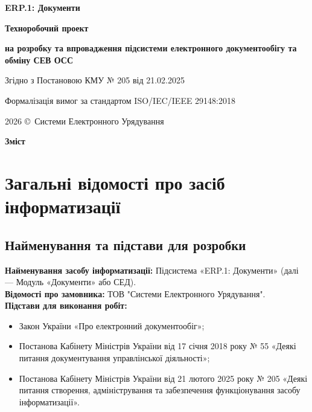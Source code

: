 \documentclass{article}
\newcommand\HUGE[1]{\fontsize{40}{40}\selectfont #1}
\begin{document}
\pagestyle{fancy}

\begin{titlepage}
  \AddToShipoutPictureBG*{\AtPageLowerLeft{\color{nato}\rule{\paperwidth}{\paperheight}}}
  \color{white}\thispagestyle{empty}\vspace*{3cm}\centering
  {\Huge  \textbf{ERP.1: Документи} \par} \vspace{1.5cm}
  {\HUGE  \textbf{Техноробочий проект} \par} \vspace{1.5cm}
  {\LARGE \textbf{на розробку та впровадження підсистеми електронного документообігу та обміну СЕВ ОСС} \par} \vspace{1.5cm}
  {\large Згідно з Постановою КМУ № 205 від 21.02.2025 \par}
  {\large Формалізація вимог за стандартом ISO/IEC/IEEE 29148:2018 \par}
  \vfill
  {\large 2026 \copyright\ Системи Електронного Урядування \par}
\end{titlepage}

\newpage

\begin{center}
  {\Huge\color{nato}\bfseries Зміст\par}
\end{center}
\vspace{40pt}
\tableofcontents

\newpage

\section{Загальні відомості про засіб інформатизації}

\subsection{Найменування та підстави для розробки}
\textbf{Найменування засобу інформатизації:} Підсистема «ERP.1: Документи» (далі --- Модуль «Документи» або СЕД).
\\
\textbf{Відомості про замовника:} ТОВ "Системи Електронного Урядування".
\\
\textbf{Підстави для виконання робіт:}
\begin{itemize}
    \item Закон України «Про електронний документообіг»;
    \item Постанова Кабінету Міністрів України від 17 січня 2018 року № 55 «Деякі питання документування управлінської діяльності»;
    \item Постанова Кабінету Міністрів України від 21 лютого 2025 року № 205 «Деякі питання створення, адміністрування та забезпечення функціонування засобу інформатизації».
\end{itemize}
\end{document}

